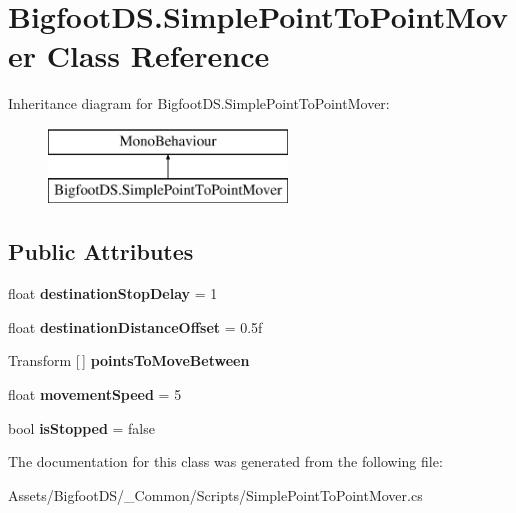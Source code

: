 \hypertarget{class_bigfoot_d_s_1_1_simple_point_to_point_mover}{}\section{Bigfoot\+D\+S.\+Simple\+Point\+To\+Point\+Mover Class Reference}
\label{class_bigfoot_d_s_1_1_simple_point_to_point_mover}
Inheritance diagram for Bigfoot\+D\+S.\+Simple\+Point\+To\+Point\+Mover\+:\begin{figure}[H]
\begin{center}
\leavevmode
\includegraphics[height=2.000000cm]{class_bigfoot_d_s_1_1_simple_point_to_point_mover}
\end{center}
\end{figure}
\subsection*{Public Attributes}
\begin{DoxyCompactItemize}
\item 
\mbox{\label{class_bigfoot_d_s_1_1_simple_point_to_point_mover_af03dba084f0e3c2cad7041ac22e7df66}} 
float {\bfseries destination\+Stop\+Delay} = 1
\item 
\mbox{\label{class_bigfoot_d_s_1_1_simple_point_to_point_mover_a6e5600a3333bce2d0a75aa34e5eb4a85}} 
float {\bfseries destination\+Distance\+Offset} = 0.\+5f
\item 
\mbox{\label{class_bigfoot_d_s_1_1_simple_point_to_point_mover_a00fcff6e73f20c51bc8c2e627e25ef9d}} 
Transform \mbox{[}$\,$\mbox{]} {\bfseries points\+To\+Move\+Between}
\item 
\mbox{\label{class_bigfoot_d_s_1_1_simple_point_to_point_mover_a5d4418a9afe7800e8ed81457a825b00d}} 
float {\bfseries movement\+Speed} = 5
\item 
\mbox{\label{class_bigfoot_d_s_1_1_simple_point_to_point_mover_ae41af53fb5b5c4416ea14fae42db521b}} 
bool {\bfseries is\+Stopped} = false
\end{DoxyCompactItemize}


The documentation for this class was generated from the following file\+:\begin{DoxyCompactItemize}
\item 
Assets/\+Bigfoot\+D\+S/\+\_\+\+Common/\+Scripts/Simple\+Point\+To\+Point\+Mover.\+cs\end{DoxyCompactItemize}
